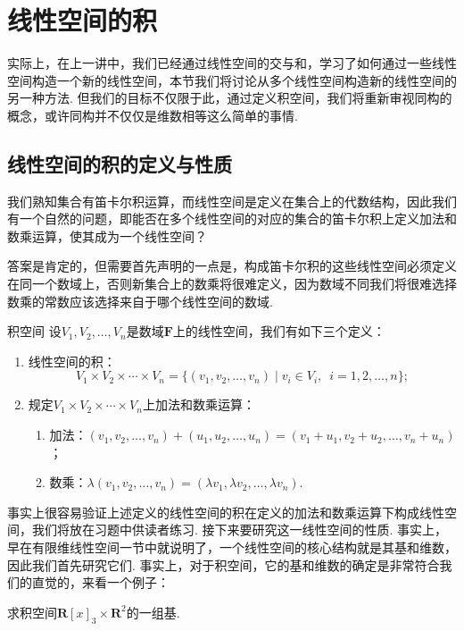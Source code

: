 \section{线性空间的积}

实际上，在上一讲中，我们已经通过线性空间的交与和，学习了如何通过一些线性空间构造一个新的线性空间，本节我们将讨论从多个线性空间构造新的线性空间的另一种方法. 但我们的目标不仅限于此，通过定义积空间，我们将重新审视同构的概念，或许同构并不仅仅是维数相等这么简单的事情.

\subsection{线性空间的积的定义与性质}

我们熟知集合有笛卡尔积运算，而线性空间是定义在集合上的代数结构，因此我们有一个自然的问题，即能否在多个线性空间的对应的集合的笛卡尔积上定义加法和数乘运算，使其成为一个线性空间？

答案是肯定的，但需要首先声明的一点是，构成笛卡尔积的这些线性空间必须定义在同一个数域上，否则新集合上的数乘将很难定义，因为数域不同我们将很难选择数乘的常数应该选择来自于哪个线性空间的数域.
\begin{definition}{}{积空间}
    设$V_1,V_2,\ldots,V_n$是数域$\mathbf{F}$上的线性空间，我们有如下三个定义：
    \begin{enumerate}
        \item 线性空间的积：
              \[V_1 \times V_2 \times \cdots \times V_n=\{(v_1,v_2,\ldots,v_n)\mid v_i \in V_i,\enspace i=1,2,\ldots,n\};\]

        \item 规定$V_1 \times V_2 \times \cdots \times V_n$上加法和数乘运算：
              \begin{enumerate}
                  \item 加法：$(v_1,v_2,\ldots,v_n)+(u_1,u_2,\ldots,u_n)=(v_1+u_1,v_2+u_2,\ldots,v_n+u_n)$；

                  \item 数乘：$\lambda(v_1,v_2,\ldots,v_n)=(\lambda v_1,\lambda v_2,\ldots,\lambda v_n)$.
              \end{enumerate}
    \end{enumerate}
\end{definition}

事实上很容易验证上述定义的线性空间的积在定义的加法和数乘运算下构成线性空间，我们将放在习题中供读者练习. 接下来要研究这一线性空间的性质. 事实上，早在有限维线性空间一节中就说明了，一个线性空间的核心结构就是其基和维数，因此我们首先研究它们. 事实上，对于积空间，它的基和维数的确定是非常符合我们的直觉的，来看一个例子：
\begin{example}{}{}
    求积空间$\mathbf{R}[x]_3\times\mathbf{R}^2$的一组基.
\end{example}

